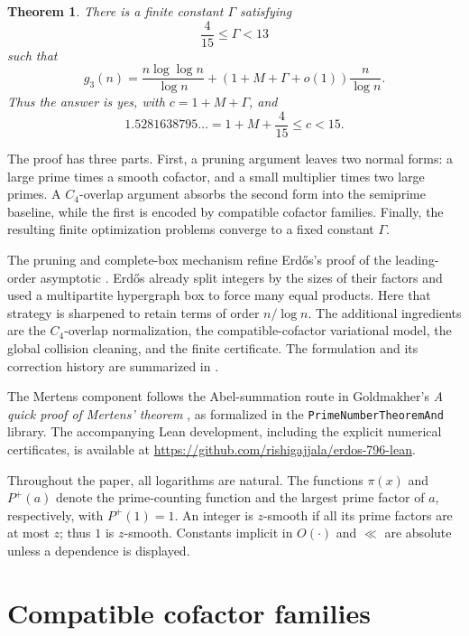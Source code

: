 \documentclass[11pt,reqno]{article}
\newtheorem{theorem}{Theorem}[section]
\theoremstyle{definition}
\begin{document}
\begin{theorem}\label{thm:main}
There is a finite constant \(\Gamma\) satisfying
\[
  \frac4{15}\leq\Gamma<13
\]
such that
\[
  g_3(n)
  =\frac{n\log\log n}{\log n}
   +\left(1+M+\Gamma+o(1)\right)\frac{n}{\log n}.
\]
Thus the answer is yes, with \(c=1+M+\Gamma\), and
\[
  1.5281638795\ldots
  =1+M+\frac4{15}\leq c<15.
\]
\end{theorem}

The proof has three parts.  First, a pruning argument leaves two normal
forms: a large prime times a smooth cofactor, and a small multiplier times
two large primes.  A \(C_4\)-overlap argument absorbs the second form into
the semiprime baseline, while the first is encoded by compatible cofactor
families.  Finally, the resulting finite optimization problems converge to
a fixed constant \(\Gamma\).

The pruning and complete-box mechanism refine Erd\H{o}s's proof of the
leading-order asymptotic \cite[Lemma, pp.~252--253; proof of Theorem~3,
pp.~255--261]
{Erdos1964Multiplicative}.  Erd\H{o}s already split integers by the sizes of
their factors and used a multipartite hypergraph box to force many equal
products.  Here that strategy is sharpened to retain terms of order
\(n/\log n\).  The additional ingredients are the \(C_4\)-overlap
normalization, the compatible-cofactor variational model, the global
collision cleaning, and the finite certificate.  The formulation and its
correction history are summarized in \cite{BloomErdos796}.

The Mertens component follows the Abel-summation route in Goldmakher's
\emph{A quick proof of Mertens' theorem} \cite{GoldmakherMertens}, as
formalized in the \texttt{PrimeNumberTheoremAnd} library.  The accompanying
Lean development, including the explicit numerical certificates, is
available at
\url{https://github.com/rishigajjala/erdos-796-lean}.

Throughout the paper, all logarithms are natural.  The functions \(\pi(x)\)
and \(P^+(a)\) denote the prime-counting function and the largest prime
factor of \(a\), respectively, with \(P^+(1)=1\).  An integer is
\(z\)-smooth if all its prime factors are at most \(z\); thus \(1\) is
\(z\)-smooth.  Constants implicit in \(O(\cdot)\) and \(\ll\) are absolute
unless a dependence is displayed.

\section{Compatible cofactor families}\label{sec:model}
\end{document}
